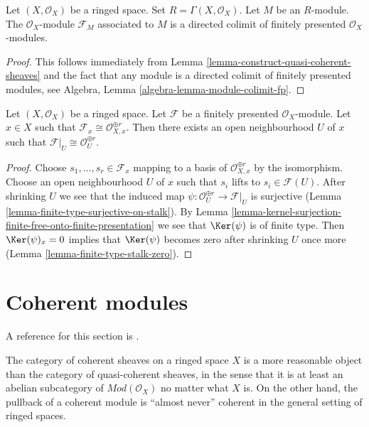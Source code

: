 \begin{lemma}
\label{lemma-quasi-coherent-limit-finite-presentation}
Let $(X, \mathcal{O}_X)$ be a ringed space.
Set $R = \Gamma(X, \mathcal{O}_X)$.
Let $M$ be an $R$-module.
The $\mathcal{O}_X$-module $\mathcal{F}_M$ associated to $M$
is a directed colimit of finitely presented $\mathcal{O}_X$-modules.
\end{lemma}

\begin{proof}
This follows immediately from
Lemma \ref{lemma-construct-quasi-coherent-sheaves}
and the fact that any module is a directed colimit
of finitely presented modules, see
Algebra, Lemma \ref{algebra-lemma-module-colimit-fp}.
\end{proof}

\begin{lemma}
\label{lemma-finite-presentation-stalk-free}
Let $(X, \mathcal{O}_X)$ be a ringed space. Let $\mathcal{F}$ be
a finitely presented $\mathcal{O}_X$-module. Let $x \in X$ such that
$\mathcal{F}_x \cong \mathcal{O}_{X, x}^{\oplus r}$. Then there exists
an open neighbourhood $U$ of $x$ such that
$\mathcal{F}|_U \cong \mathcal{O}_U^{\oplus r}$.
\end{lemma}

\begin{proof}
Choose $s_1, \ldots, s_r \in \mathcal{F}_x$ mapping to a basis of
$\mathcal{O}_{X, x}^{\oplus r}$ by the isomorphism. Choose an open
neighbourhood $U$ of $x$ such that $s_i$ lifts to $s_i \in \mathcal{F}(U)$.
After shrinking $U$ we see that the induced map
$\psi : \mathcal{O}_U^{\oplus r} \to \mathcal{F}|_U$ is surjective
(Lemma \ref{lemma-finite-type-surjective-on-stalk}).
By Lemma \ref{lemma-kernel-surjection-finite-free-onto-finite-presentation}
we see that $\Ker(\psi)$ is of finite type.
Then $\Ker(\psi)_x = 0$ implies that $\Ker(\psi)$ becomes zero
after shrinking $U$ once more (Lemma \ref{lemma-finite-type-stalk-zero}).
\end{proof}





\section{Coherent modules}
\label{section-coherent}

\noindent
A reference for this section is \cite{FAC}.

\medskip\noindent
The category of coherent sheaves on a ringed space $X$
is a more reasonable object
than the category of quasi-coherent sheaves, in the sense
that it is at least an abelian subcategory of $\textit{Mod}(\mathcal{O}_X)$
no matter what $X$ is. On the other hand, the pullback of a
coherent module is ``almost never'' coherent in the general setting
of ringed spaces.

